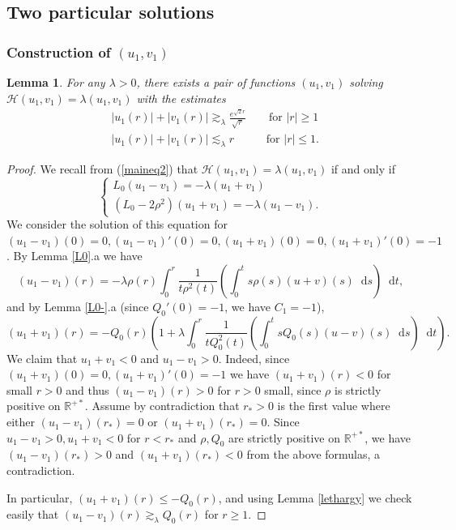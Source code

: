 \documentclass[11 pt]{amsart}
\newtheorem{lem}{Lemma}[section]
\theoremstyle{definition}
\theoremstyle{remark}
\numberwithin{equation}{section}
\newcommand{\dd}{\mathop{}\!\mathrm{d}}
\begin{document}
\subsection{Two particular solutions}\label{ss24n}

\subsubsection{Construction of $(u_1, v_1)$}

\begin{lem}
  \label{const1}For any $\lambda > 0$, there exists a pair of functions $(u_1,
  v_1)$ solving $ \mathcal{H}(u_1,v_1)=\lambda(u_1,v_1)$ with the estimates
  \begin{align*}
& | u_1 (r) | + | v_1 (r) | \gtrsim_{\lambda}  \frac{e^{\sqrt{2}
     r}}{\sqrt{r}}  \qquad \mbox{for $|r| \geq 1$} \\
& | u_1 (r) | + | v_1 (r) | \lesssim_{\lambda} r \qquad \;\;\; \mbox{for $|r| \leq 1$}. 
  \end{align*} 
\end{lem}

\begin{proof}
  We recall from (\ref{maineq2}) that $\mathcal H (u_1,v_1)=\lambda(u_1,v_1)$ if and only if
  \[ \left\{\begin{array}{l}
       L_0 (u_1 - v_1) = - \lambda (u_1 + v_1)\\
       (L_0 - 2 \rho^2) (u_1 + v_1) = - \lambda (u_1 - v_1) .
     \end{array}\right. \]
  We consider the solution of this equation for $(u_1 - v_1) (0) = 0, (u_1 -
  v_1)' (0) = 0, (u_1 + v_1) (0) = 0, (u_1 + v_1)' (0) = - 1$. By Lemma
  \ref{L0}.a we have
  \[ (u_1 - v_1) (r) = - \lambda \rho (r) \int_0^r \frac{1}{t \rho^2 (t)}
     \left( \int_0^t s \rho (s) (u + v) (s)\dd s\right)\dd t , \]
  and by Lemma \ref{L0-}.a (since $Q_0' (0) = - 1$, we have $C_1 = - 1$),
  \[ (u_1 + v_1) (r) = - Q_0 (r) \left( 1 + \lambda \int_0^r \frac{1}{t Q_0^2
     (t)} \left( \int_0^t s Q_0 (s) (u - v) (s)\dd s\right)\dd t  \right) . \]
    We claim that $u_1+v_1<0$ and $u_1-v_1>0$. Indeed, since $(u_1 + v_1) (0) = 0, (u_1 + v_1)' (0) =
  - 1$ we have $(u_1 + v_1) (r) < 0$ for small $r > 0$ and thus $(u_1 - v_1)
  (r) > 0$ for $r > 0$ small, since $\rho$ is strictly positive on
  $\mathbb{R}^{+ \ast}$. Assume by contradiction that $r_{\ast} > 0$ is the first value where either $(u_1 -
  v_1) (r_{\ast}) = 0$ or $(u_1 + v_1) (r_{\ast}) = 0$. Since $u_1 - v_1 > 0,
  u_1 + v_1 < 0$ for $r < r_{\ast}$ and $\rho, Q_0$ are strictly positive on
  $\mathbb{R}^{+ \ast}$, we have $(u_1 -
  v_1) (r_{\ast})> 0$ and $(u_1 +
  v_1) (r_{\ast})< 0$ from the above formulas, a contradiction.
  
  In particular, $(u_1 + v_1) (r) \leqslant - Q_0 (r)$, and using Lemma
  \ref{lethargy} we check easily that $(u_1 - v_1) (r) \gtrsim_{\lambda} Q_0
  (r)$ for $r \geqslant 1$.
\end{proof}
\end{document}
